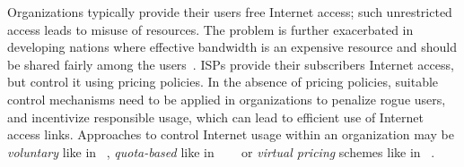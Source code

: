 \documentclass[conference]{../../IEEEtran}
\begin{document}




Organizations typically provide their users free Internet access; such unrestricted access leads to misuse of resources. The problem is further exacerbated in developing nations where effective bandwidth is an expensive resource and should be shared fairly among the users~\cite{references:haq13}. ISPs provide their subscribers Internet access, but control it using pricing policies. In the absence of pricing policies, suitable control mechanisms need to be applied in organizations to penalize rogue users, and incentivize responsible usage, which can lead to efficient use of Internet access links. Approaches to control Internet usage within an organization may be \emph{voluntary} like in ~\cite{references:balakrishnan99}, \emph{quota-based} like in   ~\cite{references:lin}~\cite{references:paine}~\cite{references:chu} or \emph{virtual pricing} schemes like in ~\cite{references:lee11}.
\end{document}

